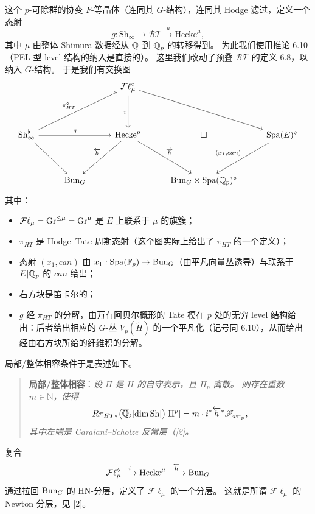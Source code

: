 这个 $p$-可除群的协变 $F$-等晶体（连同其 $G$-结构），连同其 Hodge 滤过，定义一个态射
\[
g:\mathrm{Sh}_\infty\longrightarrow\mathcal{BT}\xrightarrow{\ u\ }\mathrm{Hecke}^\mu,
\]
其中 $\mu$ 由整体 Shimura 数据经从 $\mathbb{Q}$ 到 $\mathbb{Q}_p$ 的转移得到。
为此我们使用推论 6.10（PEL 型 level 结构的纳入是直接的）。
这里我们改动了预叠 $\mathcal{BT}$ 的定义 6.8，以纳入 $G$-结构。
于是我们有交换图
\[
\begin{tikzcd}[row sep=3.6em, column sep=2.6em]
 & & \mathcal{F}\ell_\mu^\diamond \arrow[d, "i"'] \arrow[drr] & & \\
\mathrm{Sh}_\infty^\flat \arrow[urr, "\pi_{HT}^\diamond"] \arrow[rr, "g"] \arrow[dr] & & \mathrm{Hecke}^\mu \arrow[dl, "\overleftarrow{h}"'] \arrow[dr, "\overrightarrow{h}"] & \square & \Spa(E)^\diamond \arrow[dl, "{(x_1,can)}"'] \\
 & \Bun_G & & \Bun_G\times\Spa(\QQ_p)^\diamond &
\end{tikzcd}
\]
其中：
\begin{itemize}
\item $\mathcal{F}\ell_\mu=\mathrm{Gr}^{\le\mu}=\mathrm{Gr}^\mu$ 是 $E$ 上联系于 $\mu$ 的旗簇；
\item $\pi_{HT}$ 是 Hodge--Tate 周期态射（这个图实际上给出了 $\pi_{HT}$ 的一个定义）；
\item 态射 $(x_1,can)$ 由 $x_1:\mathrm{Spa}(\mathbb{F}_p)\to\mathrm{Bun}_G$（由平凡向量丛诱导）与联系于 $E|\mathbb{Q}_p$ 的 $can$ 给出；
\item 右方块是笛卡尔的；
\item $g$ 经 $\pi_{HT}$ 的分解，由万有阿贝尔概形的 Tate 模在 $p$ 处的无穷 level 结构给出：后者给出相应的 $G$-丛 $V_p(\widetilde{H})$ 的一个平凡化（记号同 6.10），从而给出经由右方块所给的纤维积的分解。
\end{itemize}

局部/整体相容条件于是表述如下。

\begin{quote}
\noindent\textbf{局部/整体相容}：\itshape 设 $\Pi$ 是 $H$ 的自守表示，且 $\Pi_p$ 离散。
则存在重数 $m\in\mathbb{N}$，使得
\[
R\pi_{HT*}\bigl(\overline{\mathbb{Q}}_\ell[\dim\mathrm{Sh}]\bigr)[\Pi^p]
=m\cdot i^*\overleftarrow{h}^*\mathscr{F}_{\varphi_{\Pi_p}},
\]
其中左端是 Caraiani--Scholze 反常层（[2]。
\end{quote}

\begin{remark}
复合
\[
\mathcal{F}\ell^\diamond_\mu\xrightarrow{\ i\ }\mathrm{Hecke}^\mu
\xrightarrow{\ \overleftarrow{h}\ }\Bun_G
\]
通过拉回 $\mathrm{Bun}_G$ 的 HN-分层，定义了 $\mathcal{F}\ell_\mu$ 的一个分层。
这就是所谓 $\mathcal{F}\ell_\mu$ 的 Newton 分层，见 [2]。
\end{remark}

